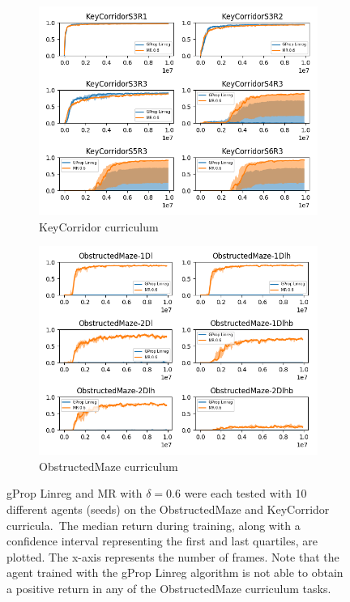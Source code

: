 \documentclass{article}
\begin{document}
\begin{figure}
     \centering
     \begin{subfigure}[b]{0.48\textwidth}
         \centering
         \includegraphics[width=\textwidth]{Stats/KC-Return-MR-base}
         \caption{KeyCorridor curriculum}
         \label{fig55}
     \end{subfigure}
     \hfill
     \begin{subfigure}[b]{0.48\textwidth}
         \centering
         \includegraphics[width=\textwidth]{Stats/OM-Return-MR-base}
         \caption{ObstructedMaze curriculum}
         \label{fig56}
     \end{subfigure}
        \caption{gProp Linreg and MR with \(\delta = 0.6\)  were each tested with 10 different agents (seeds) on the ObstructedMaze and KeyCorridor curricula.\  The median return during training, along with a confidence interval representing the first and last quartiles, are plotted. The x-axis represents the number of frames. Note that the agent trained with the gProp Linreg algorithm is not able to obtain a positive return in any of the ObstructedMaze curriculum tasks.}
        \label{fig:555}
\end{figure}
\end{document}

